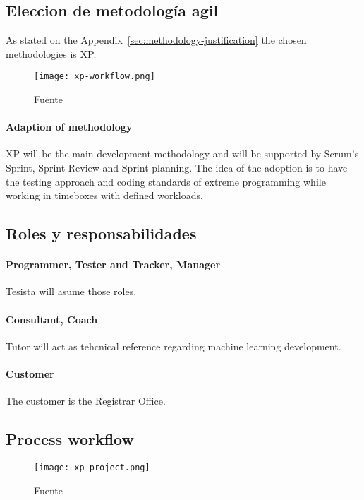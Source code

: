\subsection{Eleccion de metodología agil}

As stated on the Appendix~\ref{sec:methodology-justification} the chosen methodologies is XP.

\begin{figure}
    \texttt{[image: xp-workflow.png]}
    \caption{Fuente \textcite{abrahamsson2017agile}}\label{fig:xp-workflow}
\end{figure}

\paragraph{Adaption of methodology} XP will be the main development methodology and will be supported by Scrum's Sprint, Sprint Review and Sprint planning.
The idea of the adoption is to have the testing approach and coding standards of extreme programming while working in timeboxes with defined workloads.


\subsection{Roles y responsabilidades}

\paragraph{Programmer, Tester and Tracker, Manager} Tesista will asume those roles.

\paragraph{Consultant, Coach} Tutor will act as tehcnical reference regarding machine learning development.

\paragraph{Customer} The customer is the Registrar Office.

\subsection{Process workflow}

\begin{figure}
    \texttt{[image: xp-project.png]}
    \caption{Fuente \textcite{XpWeb}}\label{fig:xp-project}
\end{figure}


